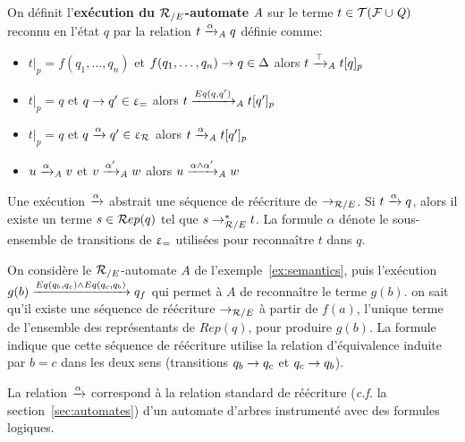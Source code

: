 
\begin{definition}
  \label{def:xrw_alpha}
  On définit l'\textbf{exécution du ${\mathcal R_{/E}}$-automate} $\mathit A$ sur le terme $t \in \mathcal{ T(F \cup \mathit Q)}$ reconnu en l'état $q$ 
  par la relation $t \xrightarrow{\alpha}_\mathit A q$ définie comme:
  \begin{itemize}
  \item $t|_p = f(q_1, \dots, q_n)$ et $f(q_1, \dots, q_n) \rightarrow q \in \Delta$
    alors $t \xrightarrow{\top}_\mathit A t[q]_p$
  \item $t|_p = q$ et $q \rightarrow q' \in \upvarepsilon_{=}$ alors $t \xrightarrow{Eq(q, q')}_\mathit A t[q']_p$
  \item $t|_p = q$ et $q \xrightarrow{\alpha} q' \in \upvarepsilon_{\mathcal R}$ alors $t \xrightarrow{\alpha}_\mathit A t[q']_p$ 
  \item $u \xrightarrow{\alpha}_\mathit A v$ et  $v \xrightarrow{\alpha'}_\mathit A w$ alors $u \xrightarrow{\alpha \land \alpha'}_\mathit A w$
  \end{itemize}
\end{definition}

\noindent
Une exécution $\xrightarrow{\alpha}$ abstrait une séquence de réécriture de $\rightarrow_{\mathcal R/E}$. Si $t
\xrightarrow{\alpha} q$, alors il existe un terme $s\in \mathcal R ep(q)$ tel que 
$s\rightarrow_{\mathcal R/E}^* t$. La formule  $\alpha$ dénote le sous-ensemble de transitions de $\upvarepsilon_{=}$ 
utilisées pour reconnaître $t$ dans $q$.


\begin{example}
  On considère le ${\mathcal R_{/E}}$-automate $A$ de l'exemple~\ref{ex:semantics}, puis l'exécution
  $g(b) \xrightarrow{Eq(q_b, q_c) \land Eq (q_c, q_b)} q_f$ qui permet à $A$ de reconnaître le terme $g(b)$.
  on sait qu'il existe une séquence de réécriture $\rightarrow_{\mathcal R/E}$ à partir de $f(a)$, l'unique terme
  de l'ensemble des représentants de $Rep(q)$, pour produire $g(b)$. 
  La formule indique que cette séquence de réécriture utilise 
  la relation d'équivalence  induite par $b = c$ dans les deux sens
  (transitions $q_b \rightarrow q_c$ et $q_c \rightarrow q_b$).
\end{example}


La relation $\xrightarrow{\alpha}$ correspond à la relation standard de réécriture 
(\textit{c.f.} la section~\ref{sec:automates}) d'un automate d'arbres instrumenté avec
des formules logiques.

